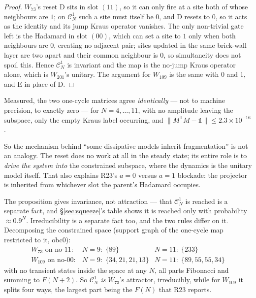 \documentclass[11pt]{article}
\theoremstyle{plain}
\theoremstyle{remark}
\begin{document}
\begin{proof}
$W_{73}$'s reset $\mathrm{D}$ sits in slot $(11)$, so it can only fire at a site
both of whose neighbours are $1$; on $\mathcal{C}^1_N$ such a site must itself
be $0$, and $\mathrm{D}$ resets to $0$, so it acts as the identity and its jump
Kraus operator vanishes. The only non-trivial gate left is the Hadamard in slot
$(00)$, which can set a site to $1$ only when both neighbours are $0$, creating
no adjacent pair; sites updated in the same brick-wall layer are two apart and
their common neighbour is $0$, so simultaneity does not spoil this. Hence
$\mathcal{C}^1_N$ is invariant and the map is the no-jump Kraus operator alone,
which is $W_{201}$'s unitary. The argument for $W_{109}$ is the same with $0$
and $1$, and $\mathrm{E}$ in place of $\mathrm{D}$.
\end{proof}

\noindent Measured, the two one-cycle matrices agree \emph{identically} --- not
to machine precision, to exactly zero --- for $N = 4,\dots,11$, with no
amplitude leaving the subspace, only the empty Kraus label occurring, and
$\lVert M^{\mathsf T}M - \mathbb{1}\rVert \le 2.3\times10^{-16}$.

So the mechanism behind ``some dissipative models inherit fragmentation'' is
not an analogy. The reset does no work at all in the steady state; its entire
role is to \emph{drive the system into} the constrained subspace, where the
dynamics is the unitary model itself. That also explains R23's $a=0$ versus
$a=1$ blockade: the projector is inherited from whichever slot the parent's
Hadamard occupies.

The proposition gives invariance, not attraction --- that $\mathcal{C}^1_N$ is
reached is a separate fact, and \S\ref{sec:squeeze}'s table shows it is reached
only with probability $\approx 0.9^N$. Irreducibility is a separate fact too,
and the two rules differ on it. Decomposing the constrained space (support
graph of the one-cycle map restricted to it, obc0):
\[
  \begin{array}{lll}
  W_{73} \text{ on no-}11: & N=9:\; \{89\} & N=11:\; \{233\}\\
  W_{109}\text{ on no-}00: & N=9:\; \{34,21,21,13\} & N=11:\; \{89,55,55,34\}
  \end{array}
\]
with no transient states inside the space at any $N$, all parts Fibonacci and
summing to $F(N+2)$. So $\mathcal{C}^1_N$ \emph{is} $W_{73}$'s attractor,
irreducibly, while for $W_{109}$ it splits four ways, the largest part being the
$F(N)$ that R23 reports.
\end{document}
